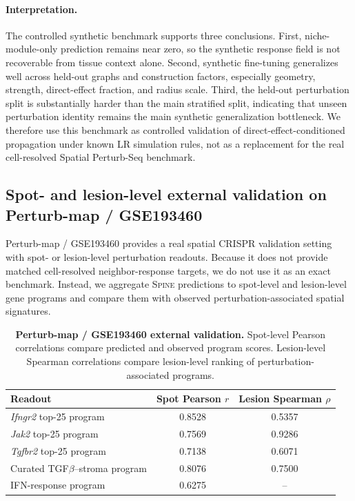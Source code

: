 \documentclass[sigconf,review,balance=false]{acmart}
\newcommand{\methodname}{\textsc{Spine}\xspace}
\begin{document}
\paragraph{Interpretation.}
The controlled synthetic benchmark supports three conclusions. First, niche-module-only
prediction remains near zero, so the synthetic response field is not recoverable from
tissue context alone. Second, synthetic fine-tuning generalizes well across held-out
graphs and construction factors, especially geometry, strength, direct-effect fraction, and
radius scale. Third, the held-out perturbation split is substantially harder than the
main stratified split, indicating that unseen perturbation identity remains the main
synthetic generalization bottleneck. We therefore use this benchmark as controlled
validation of direct-effect-conditioned propagation under known LR simulation rules, not as
a replacement for the real cell-resolved Spatial Perturb-Seq benchmark.

\subsection{Spot- and lesion-level external validation on Perturb-map / GSE193460}
\label{app:perturbmap_validation}

Perturb-map / GSE193460 provides a real spatial CRISPR validation setting with
spot- or lesion-level perturbation readouts. Because it does not provide matched
cell-resolved neighbor-response targets, we do not use it as an exact benchmark.
Instead, we aggregate \methodname{} predictions to spot-level and lesion-level gene
programs and compare them with observed perturbation-associated spatial signatures.

\begin{table}[t]
\centering
\small
\setlength{\tabcolsep}{4pt}
\renewcommand{\arraystretch}{1.08}
\caption{\textbf{Perturb-map / GSE193460 external validation.}
Spot-level Pearson correlations compare predicted and observed program scores.
Lesion-level Spearman correlations compare lesion-level ranking of perturbation-associated
programs.}
\label{tab:perturbmap_external}
\begin{tabular}{lcc}
\toprule
Readout & Spot Pearson $r$ & Lesion Spearman $\rho$ \\
\midrule
\textit{Ifngr2} top-25 program & 0.8528 & 0.5357 \\
\textit{Jak2} top-25 program & 0.7569 & 0.9286 \\
\textit{Tgfbr2} top-25 program & 0.7138 & 0.6071 \\
Curated TGF$\beta$--stroma program & 0.8076 & 0.7500 \\
IFN-response program & 0.6275 & -- \\
\bottomrule
\end{tabular}
\end{table}
\end{document}
